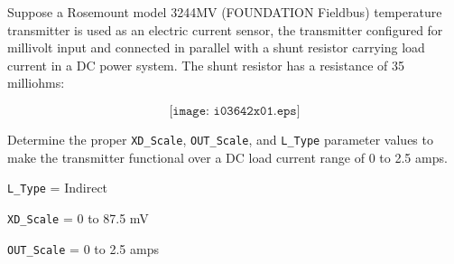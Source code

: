 

Suppose a Rosemount model 3244MV (FOUNDATION Fieldbus) temperature transmitter is used as an electric current sensor, the transmitter configured for millivolt input and connected in parallel with a shunt resistor carrying load current in a DC power system.  The shunt resistor has a resistance of 35 milliohms:

$$\texttt{[image: i03642x01.eps]}$$

Determine the proper {\tt XD\_Scale}, {\tt OUT\_Scale}, and {\tt L\_Type} parameter values to make the transmitter functional over a DC load current range of 0 to 2.5 amps.







{\tt L\_Type} = Indirect

\vskip 10pt

{\tt XD\_Scale} = 0 to 87.5 mV

\vskip 10pt

{\tt OUT\_Scale} = 0 to 2.5 amps











